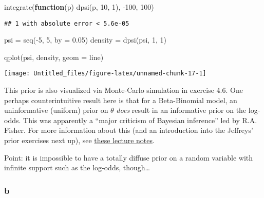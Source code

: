 \documentclass[
]{article}
\newenvironment{Shaded}{\begin{snugshade}}{\end{snugshade}}
\newcommand{\AttributeTok}[1]{\textcolor[rgb]{0.77,0.63,0.00}{#1}}
\newcommand{\ControlFlowTok}[1]{\textcolor[rgb]{0.13,0.29,0.53}{\textbf{#1}}}
\newcommand{\DecValTok}[1]{\textcolor[rgb]{0.00,0.00,0.81}{#1}}
\newcommand{\FloatTok}[1]{\textcolor[rgb]{0.00,0.00,0.81}{#1}}
\newcommand{\FunctionTok}[1]{\textcolor[rgb]{0.00,0.00,0.00}{#1}}
\newcommand{\NormalTok}[1]{#1}
\newcommand{\OtherTok}[1]{\textcolor[rgb]{0.56,0.35,0.01}{#1}}
\newcommand{\SpecialCharTok}[1]{\textcolor[rgb]{0.00,0.00,0.00}{#1}}
\newcommand{\StringTok}[1]{\textcolor[rgb]{0.31,0.60,0.02}{#1}}
\begin{document}
\begin{Shaded}
\begin{Highlighting}[]
\FunctionTok{integrate}\NormalTok{(}\ControlFlowTok{function}\NormalTok{(p) }\FunctionTok{dpsi}\NormalTok{(p, }\DecValTok{10}\NormalTok{, }\DecValTok{1}\NormalTok{), }\SpecialCharTok{{-}}\DecValTok{100}\NormalTok{, }\DecValTok{100}\NormalTok{)}
\end{Highlighting}
\end{Shaded}

\begin{verbatim}
## 1 with absolute error < 5.6e-05
\end{verbatim}

\begin{Shaded}
\begin{Highlighting}[]
\NormalTok{psi }\OtherTok{=} \FunctionTok{seq}\NormalTok{(}\SpecialCharTok{{-}}\DecValTok{5}\NormalTok{, }\DecValTok{5}\NormalTok{, }\AttributeTok{by =} \FloatTok{0.05}\NormalTok{)}
\NormalTok{density }\OtherTok{=} \FunctionTok{dpsi}\NormalTok{(psi, }\DecValTok{1}\NormalTok{, }\DecValTok{1}\NormalTok{)}

\FunctionTok{qplot}\NormalTok{(psi, density, }\AttributeTok{geom =} \StringTok{\textquotesingle{}line\textquotesingle{}}\NormalTok{)}
\end{Highlighting}
\end{Shaded}

\begin{center}\texttt{[image: Untitled\_files/figure-latex/unnamed-chunk-17-1]} \end{center}

This prior is also visualized via Monte-Carlo simulation in exercise
4.6. One perhaps counterintuitive result here is that for a
Beta-Binomial model, an uninformative (uniform) prior on \(\theta\)
\emph{does} result in an informative prior on the log-odds. This was
apparently a ``major criticism of Bayesian inference'' led by R.A.
Fisher. For more information about this (and an introduction into the
Jeffreys' prior exercises next up), see
\href{https://www2.stat.duke.edu/courses/Fall11/sta114/jeffreys.pdf}{these
lecture notes}.

Point: it is impossible to have a totally diffuse prior on a random
variable with infinite support such as the log-odds, though\ldots{}

\hypertarget{b-5}{%
\subsubsection{b}\label{b-5}}
\end{document}
